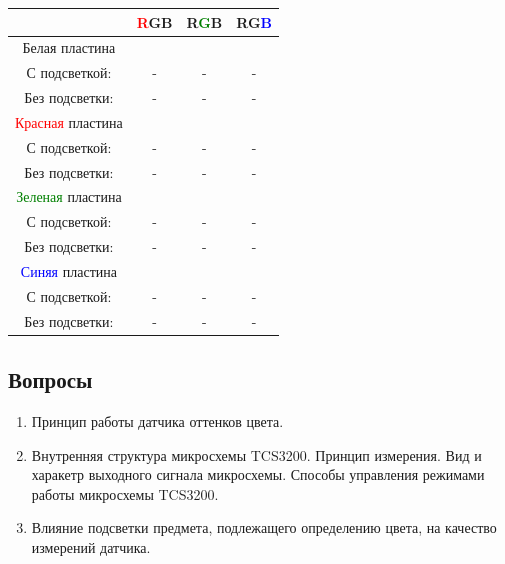 \documentclass[12pt]{article}
\begin{document}
\begin{table}[H]
    \centering
    \caption{Модель RGB для исследуемых предметов}\label{rgbtable}
    \begin{longtable}[]{c|c|c|c}
        \toprule
          & \textcolor{red}{R}GB & R\textcolor{green}{G}B & RG\textcolor{blue}{B} \\
        \midrule
        Белая пластина &  &  &  \\
        \hline
        С подсветкой: & - & - & - \\
        Без подсветки: & - & - & - \\
        \hline
        \textcolor{red}{Красная} пластина &  &  &  \\
        \hline
        С подсветкой: & - & - & - \\
        Без подсветки: & - & - & - \\
        \hline
        \textcolor{green}{Зеленая} пластина &  &  &  \\
        \hline
        С подсветкой: & - & - & - \\
        Без подсветки: & - & - & - \\
        \hline
        \textcolor{blue}{Синяя} пластина &  &  &  \\
        \hline
        С подсветкой: & - & - & - \\
        Без подсветки: & - & - & - \\
        \bottomrule
    \end{longtable}
\end{table}

\subsection{Вопросы}

\begin{enumerate}
    \item Принцип работы датчика оттенков цвета.
    \item Внутренняя структура микросхемы TCS3200. Принцип измерения. Вид и харакетр выходного сигнала микросхемы. Способы управления режимами работы микросхемы TCS3200.
    \item Влияние подсветки предмета, подлежащего определению цвета, на качество измерений датчика.
\end{enumerate}
\end{document}
